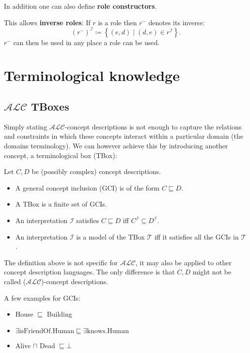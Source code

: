 In addition one can also define \textbf{role constructors}.
\begin{example}
	This allows \textbf{inverse roles}:
	If $r$ is a role then $r^{-}$ denotes its inverse:
	\[
		\left( r^{-} \right) ^{\mathcal{I}} \coloneqq \left\{ (e,d) \mid (d,e) \in r^{\mathcal{I}} \right\} 
	.\] 
	$r^{-}$ can then be used in any place a role can be used.
\end{example}

\newpage
\section{Terminological knowledge}
\subsection{$\mathcal{ALC}$ TBoxes}
Simply stating $\mathcal{ALC}$-concept descriptions is not enough to capture the relations and constraints in which these concepts interact within a particular domain (the domains terminology).
We can however achieve this by introducing another concept, a terminological box (TBox):

\begin{definition}
	Let $C, D$ be (possibly complex) concept descriptions.
	\begin{itemize}
		\item A general concept inclusion (GCI) is of the form $C \sqsubseteq D$.
		\item A TBox is a finite set of GCIs.
		\item An interpretation $\mathcal{I}$ satisfies $C \sqsubseteq D$ iff $C^{\mathcal{I}} \subseteq D^{\mathcal{I}}$.
		\item An interpretation $\mathcal{I}$ is a model of the TBox $\mathcal{T}$ iff it satisfies all the GCIs in $\mathcal{T}$.
	\end{itemize}
\end{definition}

\begin{note}
	The definition above is not specific for $\mathcal{ALC}$, it may also be applied to other concept description languages.
	The only difference is that $C, D$ might not be called ($\mathcal{ALC}$)-concept descriptions.
\end{note}

\begin{example}
	A few examples for GCIs:
	 \begin{itemize}
		\item House $\sqsubseteq$ Building
		\item $\exists\text{isFriendOf}.\text{Human} \sqsubseteq \exists\text{knows}.\text{Human}$
		\item Alive $\sqcap$ Dead $\sqsubseteq \bot$ 
	\end{itemize}
\end{example}

